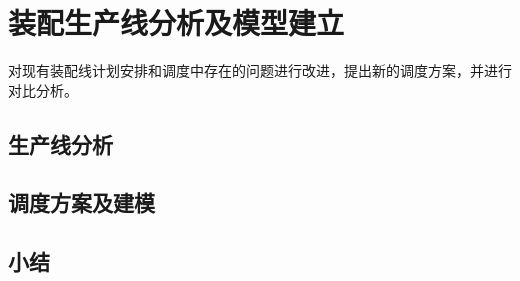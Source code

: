 \chapter{装配生产线分析及模型建立}
对现有装配线计划安排和调度中存在的问题进行改进，提出新的调度方案，并进行对比分析。
\section{生产线分析}


\section{调度方案及建模}


\section{小结}